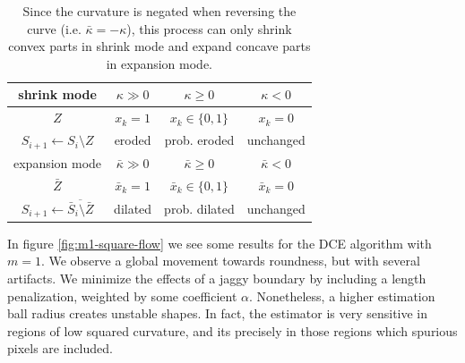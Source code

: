 \documentclass[runningheads]{llncs}
\begin{document}
\begin{table}
  \center
  \begin{tabular}{|c|c|c|c|} \hline
    shrink mode &    $\kappa \gg 0$ & $\kappa \geq 0$ &  $\kappa < 0$ \\ \hline
    $Z$ & $x_k=1$ & $x_k \in \{0,1\}$ & $x_k=0$ \\ \hline
    $S_{i+1} \leftarrow S_i \setminus Z$ & eroded & prob. eroded & unchanged  \\ \hline \hline
    expansion mode &    $\bar{\kappa} \gg 0$ & $\bar{\kappa} \geq 0$ & $\bar{\kappa} < 0$ \\ \hline
    $\bar{Z}$ & $\bar{x}_k=1$ & $\bar{x}_k \in \{0,1\}$ & $\bar{x}_k=0$ \\ \hline
    $S_{i+1} \leftarrow \overline{\bar{S}_i \setminus \bar{Z}}$ & dilated & prob. dilated & unchanged \\ \hline 
  \end{tabular}
  
  \label{tab:flow-summary}	  
  \caption{  Since the curvature is negated when reversing the curve (i.e. $\bar{\kappa}=-\kappa$), this process can only shrink  convex parts in shrink mode and expand concave parts in expansion mode.}

\end{table}


In figure \ref{fig:m1-square-flow} we see some results for the DCE algorithm  with $m=1$. We observe a global movement towards roundness, but with several artifacts. We minimize the effects of a jaggy boundary by including a length penalization, weighted by some coefficient $\alpha$. Nonetheless, a higher estimation ball radius creates unstable shapes. In fact, the estimator is very sensitive in regions of low squared curvature, and its precisely in those regions which spurious pixels are included.
\end{document}

